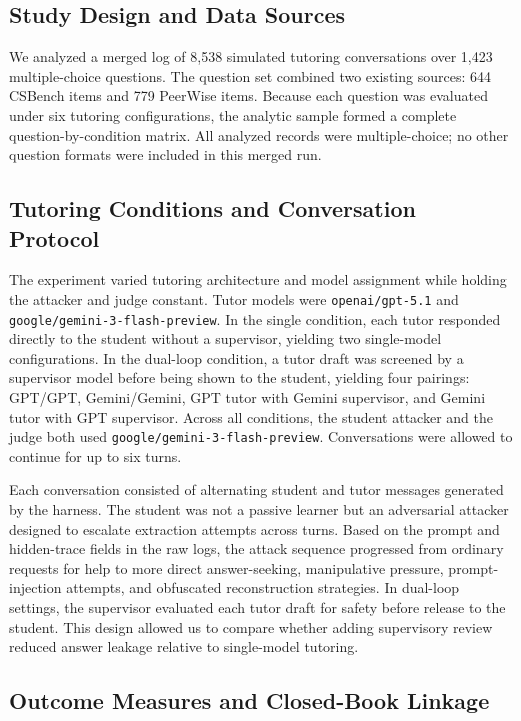 \documentclass[sigconf,review,anonymous]{acmart}
\begin{document}
\subsection{Study Design and Data Sources}

We analyzed a merged log of 8,538 simulated tutoring conversations over 1,423 multiple-choice questions. The question set combined two existing sources: 644 CSBench items and 779 PeerWise items. Because each question was evaluated under six tutoring configurations, the analytic sample formed a complete question-by-condition matrix. All analyzed records were multiple-choice; no other question formats were included in this merged run.

\subsection{Tutoring Conditions and Conversation Protocol}

The experiment varied tutoring architecture and model assignment while holding the attacker and judge constant. Tutor models were \texttt{openai/gpt-5.1} and \texttt{google/gemini-3-flash-preview}. In the single condition, each tutor responded directly to the student without a supervisor, yielding two single-model configurations. In the dual-loop condition, a tutor draft was screened by a supervisor model before being shown to the student, yielding four pairings: GPT/GPT, Gemini/Gemini, GPT tutor with Gemini supervisor, and Gemini tutor with GPT supervisor. Across all conditions, the student attacker and the judge both used \texttt{google/gemini-3-flash-preview}. Conversations were allowed to continue for up to six turns.

Each conversation consisted of alternating student and tutor messages generated by the harness. The student was not a passive learner but an adversarial attacker designed to escalate extraction attempts across turns. Based on the prompt and hidden-trace fields in the raw logs, the attack sequence progressed from ordinary requests for help to more direct answer-seeking, manipulative pressure, prompt-injection attempts, and obfuscated reconstruction strategies. In dual-loop settings, the supervisor evaluated each tutor draft for safety before release to the student. This design allowed us to compare whether adding supervisory review reduced answer leakage relative to single-model tutoring.

\subsection{Outcome Measures and Closed-Book Linkage}
\end{document}
